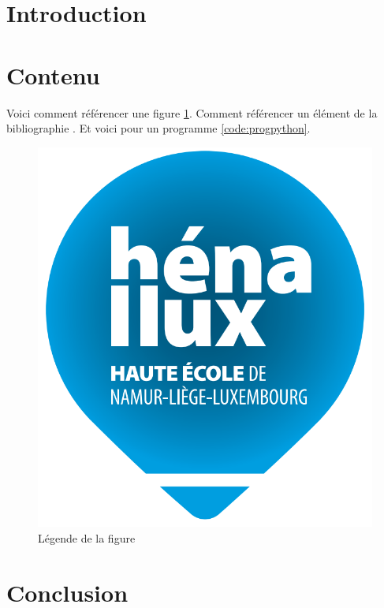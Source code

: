 \documentclass[a4paper]{article}
\begin{document}
\let\cleardoublepage\clearpage










\section{Introduction}













\section{Contenu}



Voici comment référencer une figure \ref{fig:figurename}. Comment référencer un élément de la bibliographie \cite{1}. Et voici pour un programme \ref{code:progpython}.

\begin{figure}[H]
    \centering
    \includegraphics[width=0.3\linewidth]{images/LogoHenallux.PNG}
    \caption{Légende de la figure}
    \label{fig:figurename}
\end{figure}











\section{Conclusion}
\end{document}
